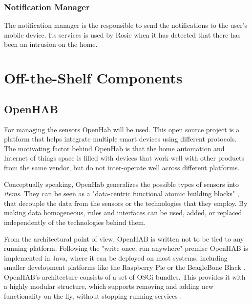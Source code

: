 \subsubsection{Notification Manager}

The notification manager is the responsible to send the notifications to the user's mobile device. Its services is used by Rosie when it has detected that there has been an intrusion on the home.

\section{Off-the-Shelf Components}

\subsection{OpenHAB}

For managing the sensors OpenHab \cite{openhabIntro} will be used. This open source project is a platform that helps integrate multiple smart devices using different protocols. The motivating factor behind OpenHab is that the home automation and Internet of things space is filled with devices that work well with other products from the same vendor, but do not inter-operate well across different platforms. 

Conceptually speaking, OpenHab generalizes the possible types of sensors into \textit{items}. They can be seen as a "data-centric functional atomic building blocks" \cite{openhabIntro}, that decouple the data from the sensors or the technologies that they employ. By making data homogeneous, rules and interfaces can be used, added, or replaced independently of the technologies behind them.

From the architectural point of view, OpenHAB is written not to be tied to any running platform. Following the "write once, run anywhere" premise OpenHAB is implemented in Java, where it can be deployed on most systems, including smaller development platforms like the Raspberry Pie or the BeagleBone Black \cite{openhabSupported}.\\
OpenHAB's architecture consists of a set of OSGi bundles. This provides it with a highly modular structure, which supports removing and adding new functionality on the fly, without stopping running services \cite{openhabRuntime}.

